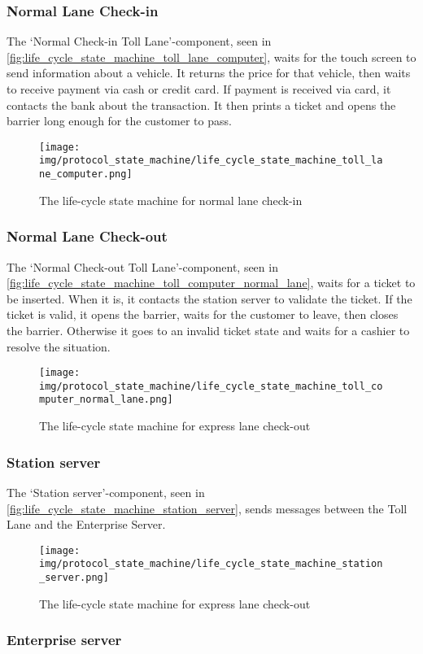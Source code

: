 \subsubsection*{Normal Lane Check-in}
The ‘Normal Check-in Toll Lane’-component, seen in \autoref{fig:life_cycle_state_machine_toll_lane_computer}, waits for the touch screen to send information about a vehicle. It returns the price for that vehicle, then waits to receive payment via cash or credit card. If payment is received via card, it contacts the bank about the transaction. It then prints a ticket and opens the barrier long enough for the customer to pass.
\begin{figure}[H]
\centering
\texttt{[image: img/protocol\_state\_machine/life\_cycle\_state\_machine\_toll\_lane\_computer.png]}
\caption{The life-cycle state machine for normal lane check-in}
\label{fig:life_cycle_state_machine_toll_lane_computer}
\end{figure}

\subsubsection*{Normal Lane Check-out}
The ‘Normal Check-out Toll Lane’-component, seen in \autoref{fig:life_cycle_state_machine_toll_computer_normal_lane}, waits for a ticket to be inserted. When it is, it contacts the station server to validate the ticket. If the ticket is valid, it opens the barrier, waits for the customer to leave, then closes the barrier. Otherwise it goes to an invalid ticket state and waits for a cashier to resolve the situation.
\begin{figure}[H]
\centering
\texttt{[image: img/protocol\_state\_machine/life\_cycle\_state\_machine\_toll\_computer\_normal\_lane.png]}
\caption{The life-cycle state machine for express lane check-out}
\label{fig:life_cycle_state_machine_toll_computer_normal_lane}
\end{figure}

\subsubsection*{Station server}
The ‘Station server’-component, seen in \autoref{fig:life_cycle_state_machine_station_server}, sends messages between the Toll Lane and the Enterprise Server.
\begin{figure}[H]
\centering
\texttt{[image: img/protocol\_state\_machine/life\_cycle\_state\_machine\_station\_server.png]}
\caption{The life-cycle state machine for express lane check-out}
\label{fig:life_cycle_state_machine_station_server}
\end{figure}


\subsubsection*{Enterprise server}